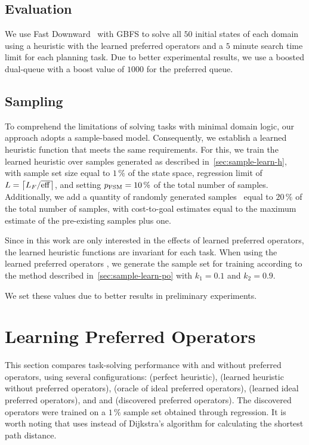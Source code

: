 \documentclass[ppgc,diss,english]{iiufrgs}
\providecommand{\ceil}[1]{\ensuremath{\left\lceil #1\right\rceil}}
\begin{document}
\subsection{Evaluation}
\label{sec:exp-evaluation}
We use Fast Downward~\cite{Helmert/2006} with GBFS to solve all $50$ initial states of each domain using a heuristic with the learned preferred operators and a $5$ minute search time limit for each planning task. Due to better experimental results, we use a boosted dual-queue with a boost value of $1000$ for the preferred queue.

\subsection{Sampling}
\label{sec:exp-sampling}
To comprehend the limitations of solving tasks with minimal domain logic, our approach adopts a sample-based model. Consequently, we establish a learned heuristic function that meets the same requirements.
For this, we train the learned heuristic \hnn over samples generated as described in~\cref{sec:sample-learn-h}, with sample set size equal to $1\,\%$ of the state space, regression limit of $L=\ceil{\facts/\overline{\eff}}$, and setting $p_{\text{FSM}}=10\,\%$ of the total number of samples. Additionally, we add a quantity of randomly generated samples~\cite{OToole/2022} equal to $20\,\%$ of the total number of samples, with cost-to-goal estimates equal to the maximum estimate of the pre-existing samples plus one.

Since in this work are only interested in the effects of learned preferred operators, the learned heuristic functions are invariant for each task. When using the learned preferred operators \pog, we generate the sample set for training according to the method described in~\cref{sec:sample-learn-po} with $k_1 = 0.1$ and $k_2 = 0.9$.

We set these values due to better results in preliminary experiments.

\section{Learning Preferred Operators}
\label{sec:exp-learning-po}
This section compares task-solving performance with and without preferred operators, using several configurations: \hstar (perfect heuristic), \hnn (learned heuristic without preferred operators), \postartable (oracle of ideal preferred operators), \postar (learned ideal preferred operators), and \pogstar and \pog (discovered preferred operators). The discovered operators were trained on a $1\,\%$ sample set obtained through regression. It is worth noting that \pogstar uses \hstar instead of Dijkstra's algorithm for calculating the shortest path distance.
\end{document}
